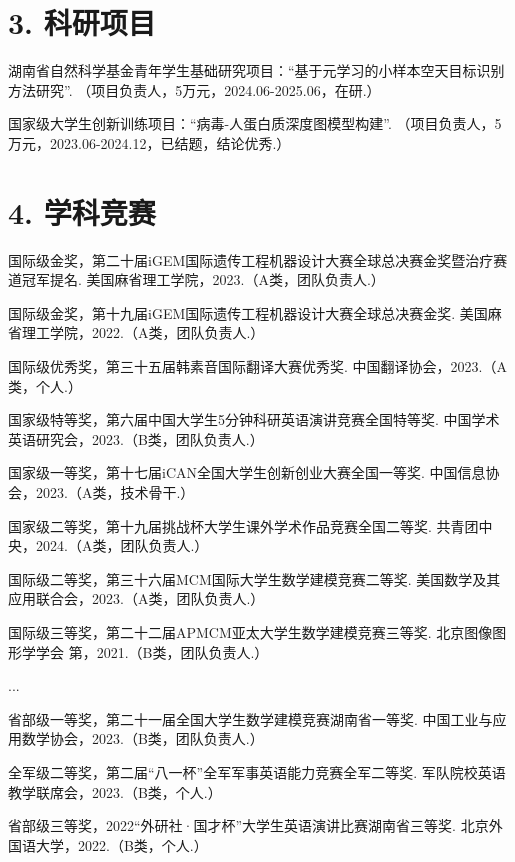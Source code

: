 \begin{resume}
    \section*{3. 科研项目} %
  \begin{enumerate}[label={[\arabic*]},itemsep=0pt,parsep=0pt,labelindent=26pt,labelwidth=*,leftmargin=0pt,itemindent=*,align=left]
  \item 湖南省自然科学基金青年学生基础研究项目：“基于元学习的小样本空天目标识别方法研究”. （项目负责人，5万元，2024.06-2025.06，在研.）
  \item 国家级大学生创新训练项目：“病毒-人蛋白质深度图模型构建”. （项目负责人，5万元，2023.06-2024.12，已结题，结论优秀.）
  \end{enumerate}

    \section*{4. 学科竞赛} %
  \begin{enumerate}[label={[\arabic*]},itemsep=0pt,parsep=0pt,labelindent=26pt,labelwidth=*,leftmargin=0pt,itemindent=*,align=left]
  \item 国际级金奖，第二十届iGEM国际遗传工程机器设计大赛全球总决赛金奖暨治疗赛道冠军提名. 美国麻省理工学院，2023.（A类，团队负责人.）
  \item 国际级金奖，第十九届iGEM国际遗传工程机器设计大赛全球总决赛金奖. 美国麻省理工学院，2022.（A类，团队负责人.）
  \item 国际级优秀奖，第三十五届韩素音国际翻译大赛优秀奖. 中国翻译协会，2023.（A类，个人.）
  \item 国家级特等奖，第六届中国大学生5分钟科研英语演讲竞赛全国特等奖. 中国学术英语研究会，2023.（B类，团队负责人.）
  \item 国家级一等奖，第十七届iCAN全国大学生创新创业大赛全国一等奖. 中国信息协会，2023.（A类，技术骨干.）
  \item 国家级二等奖，第十九届挑战杯大学生课外学术作品竞赛全国二等奖. 共青团中央，2024.（A类，团队负责人.）
  \item 国际级二等奖，第三十六届MCM国际大学生数学建模竞赛二等奖. 美国数学及其应用联合会，2023.（A类，团队负责人.）
  \item 国际级三等奖，第二十二届APMCM亚太大学生数学建模竞赛三等奖. 北京图像图形学学会
第，2021.（B类，团队负责人.）
  \item ...
  \item 省部级一等奖，第二十一届全国大学生数学建模竞赛湖南省一等奖. 中国工业与应用数学协会，2023.（B类，团队负责人.）
  \item 全军级二等奖，第二届“八一杯”全军军事英语能力竞赛全军二等奖. 军队院校英语教学联席会，2023.（B类，个人.）
  \item 省部级三等奖，2022“外研社·国才杯”大学生英语演讲比赛湖南省三等奖. 北京外国语大学，2022.（B类，个人.）
  \end{enumerate}
\end{resume}
